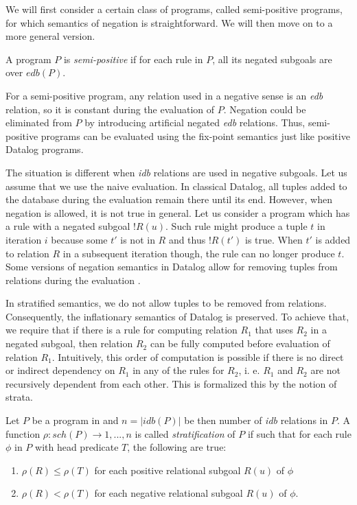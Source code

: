 We will first consider a certain class of \datalogneg programs, called semi-positive programs, for which semantics of negation is straightforward. We will then move on to a more general version.

\begin{defn}
A \datalogneg program $P$ is \emph{semi-positive} if for each rule in $P$, all its negated subgoals are over $edb(P)$.
\end{defn}

For a semi-positive program, any relation used in a negative sense is an \emph{edb} relation, so it is constant during the evaluation of $P$. Negation could be eliminated from $P$ by introducing artificial negated \emph{edb} relations. Thus, semi-positive programs can be evaluated using the fix-point semantics just like positive Datalog programs.

The situation is different when \emph{idb} relations are used in negative subgoals. Let us assume that we use the naive evaluation. In classical Datalog, all tuples added to the database during the evaluation remain there until its end. However, when negation is allowed, it is not true in general. Let us consider a program which has a rule with a negated subgoal $!R(u)$. Such rule might produce a tuple $t$ in iteration $i$ because some $t'$ is not in $R$ and thus $!R(t')$ is true. When $t'$ is added to relation $R$ in a subsequent iteration though, the rule can no longer produce $t$. Some versions of negation semantics in Datalog allow for removing tuples from relations during the evaluation \cite{fod}.

In stratified semantics, we do not allow tuples to be removed from relations. Consequently, the inflationary semantics of Datalog is preserved. To achieve that, we require that if there is a rule for computing relation $R_1$ that uses $R_2$ in a negated subgoal, then relation $R_2$ can be fully computed before evaluation of relation $R_1$. Intuitively, this order of computation is possible if there is no direct or indirect dependency on $R_1$ in any of the rules for $R_2$, i. e. $R_1$ and $R_2$ are not recursively dependent from each other. This is formalized this by the notion of strata.

\begin{defn}
Let $P$ be a program in \datalogneg and $n = |idb(P)|$ be then number of \emph{idb} relations in $P$. A function $\rho : sch(P) \to {1, . . . , n}$ is called \emph{stratification} of $P$ if such that for each rule $\phi$ in $P$ with head predicate $T$, the following are true: 

\begin{enumerate}
\item $\rho(R) \le \rho(T)$ for each positive relational subgoal $R(u)$ of $\phi$
\item $\rho(R) < \rho(T)$ for each negative relational subgoal $R(u)$ of $\phi$.
\end{enumerate}
\end{defn}

